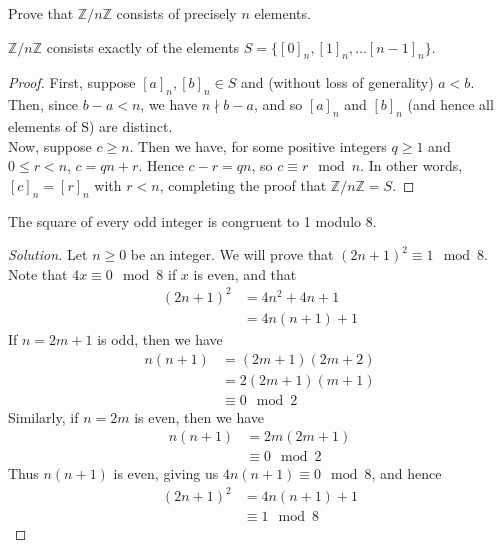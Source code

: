 \documentclass[12pt]{article}
\newenvironment{problem}[2][Problem]{\begin{trivlist}
\item[\hskip \labelsep {\bfseries #1}\hskip \labelsep {\bfseries #2.}]}{\end{trivlist}}
\newenvironment{proposition}[1][Proposition]{\begin{trivlist}
\item[\hskip \labelsep {\bfseries #1.}]}{\end{trivlist}}
\newenvironment{solution}
  {\renewcommand\qedsymbol{$\blacksquare$}\begin{proof}[Solution]}
{\end{proof}}
\begin{document}
\begin{problem}{2.10}
  Prove that $\mathbb{Z}/n\mathbb{Z}$ consists of precisely $n$ elements.
\end{problem}
\begin{proposition}
  $\mathbb{Z}/n\mathbb{Z}$ consists exactly of the elements $S= \{[0]_n, [1]_n, \dots [n-1]_n\}$.
\end{proposition}
\begin{proof}
  First, suppose $[a]_n, [b]_n \in S$ and (without loss of generality) $a < b$. 
  Then, since $b-a<n$, we have $n \nmid b-a$, and so $[a]_n$ and $[b]_n$ (and hence all elements of S) are distinct.\\
  Now, suppose $c \geq n$. 
  Then we have, for some positive integers $q \geq 1$ and $0 \leq r < n$, $c = qn + r$. 
  Hence $c-r = qn$, so $c \equiv r \mod n$. In other words, $[c]_n = [r]_n$ with $r<n$, completing the proof
  that $\mathbb{Z}/n\mathbb{Z} = S$.
\end{proof}

\begin{problem}{2.11}
  The square of every odd integer is congruent to 1 modulo 8.
\end{problem}
\begin{solution}
  Let $n \geq 0$ be an integer. We will prove that $(2n+1)^2 \equiv 1 \mod 8$. \\
  Note that $4x\equiv 0\mod 8$ if $x$ is even, and that
  \begin{align*}
    (2n+1)^2 &= 4n^2 + 4n + 1\\
    &= 4n(n+1) + 1
  \end{align*}
  If $n=2m+1$ is odd, then we have
  \begin{align*}
    n(n+1) &= (2m+1)(2m+2) \\
    &= 2(2m+1)(m+1)\\
    &\equiv 0\mod 2
  \end{align*}
  Similarly, if $n=2m$ is even, then we have
  \begin{align*}
    n(n+1) &= 2m(2m+1) \\
    &\equiv 0\mod 2
  \end{align*}
  Thus $n(n+1)$ is even, giving us $4n(n+1)\equiv 0\mod 8$, and hence 
  \begin{align*}
  (2n+1)^2 &= 4n(n+1) + 1 \\
  &\equiv 1\mod 8
  \end{align*}
\end{solution}
\end{document}
